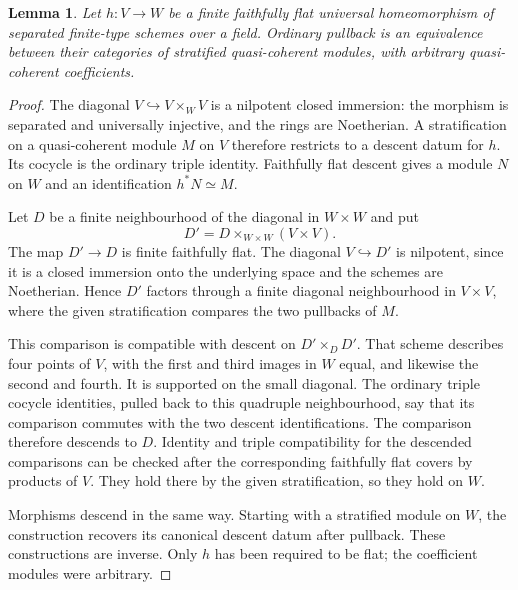 \documentclass[11pt]{article}
\newtheorem{lemma}[theorem]{Lemma}\newtheorem{proposition}[theorem]{Proposition}
\theoremstyle{definition}\newtheorem{definition}[theorem]{Definition}
\theoremstyle{remark}\newtheorem{remark}[theorem]{Remark}
\begin{document}
\begin{lemma}\label{lem:flat-homeomorphism}
Let $h:V\to W$ be a finite faithfully flat universal homeomorphism of separated finite-type schemes over a field. Ordinary pullback is an equivalence between their categories of stratified quasi-coherent modules, with arbitrary quasi-coherent coefficients.
\end{lemma}
\begin{proof}
The diagonal $V\hookrightarrow V\times_WV$ is a nilpotent closed immersion: the morphism is separated and universally injective, and the rings are Noetherian. A stratification on a quasi-coherent module $M$ on $V$ therefore restricts to a descent datum for $h$. Its cocycle is the ordinary triple identity. Faithfully flat descent gives a module $N$ on $W$ and an identification $h^*N\simeq M$.

Let $D$ be a finite neighbourhood of the diagonal in $W\times W$ and put
\[
 D'=D\times_{W\times W}(V\times V).
\]
The map $D'\to D$ is finite faithfully flat. The diagonal $V\hookrightarrow D'$ is nilpotent, since it is a closed immersion onto the underlying space and the schemes are Noetherian. Hence $D'$ factors through a finite diagonal neighbourhood in $V\times V$, where the given stratification compares the two pullbacks of $M$.

This comparison is compatible with descent on $D'\times_DD'$. That scheme describes four points of $V$, with the first and third images in $W$ equal, and likewise the second and fourth. It is supported on the small diagonal. The ordinary triple cocycle identities, pulled back to this quadruple neighbourhood, say that its comparison commutes with the two descent identifications. The comparison therefore descends to $D$. Identity and triple compatibility for the descended comparisons can be checked after the corresponding faithfully flat covers by products of $V$. They hold there by the given stratification, so they hold on $W$.

Morphisms descend in the same way. Starting with a stratified module on $W$, the construction recovers its canonical descent datum after pullback. These constructions are inverse. Only $h$ has been required to be flat; the coefficient modules were arbitrary.
\end{proof}
\end{document}
